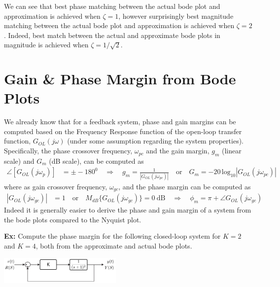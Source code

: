 \documentclass[twoside]{article}
\begin{document}
\vspace{6 pt}

We can see that best phase matching between the actual bode plot and approximation is achieved when
$\zeta = 1$, however surprisingly best magnitude matching between the actual bode plot and approximation is achieved when
$\zeta = 2$. Indeed, best match between the actual and approximate bode plots in magnitude is achieved when $\zeta = 1/\sqrt{2}$. 

\newpage

\section{Gain \& Phase Margin from Bode Plots}

We already know that for a feedback system, phase and 
gain margins can be computed based on the Frequency Response
function of the open-loop transfer function, $G_{OL}(j \omega)$ (under
some assumption regarding the system properties).
Specifically, the phase crossover frequency, $\omega_{pc}$ and the gain margin, 
$g_m$ (linear scale) and $G_m$ (dB scale), can be computed as
%
\begin{align*}
  \angle [ G_{OL}(j \omega_{p}) ] &= \pm -180^0
  \quad \Rightarrow \quad
  g_m = \frac{1}{| G_{OL}(j \omega_{pc})| } \quad \mathrm{or} \quad G_m
  = -20 \, \mathrm{log}_{10} | G_{OL}(j \omega_{pc} ) |
\end{align*}
%
where as gain crossover frequency, $\omega_{gc}$, and the 
phase margin can be computed as
%
\begin{align*}
  | G_{OL}(j \omega_{gc}) | &= 1 \quad \mathrm{or} \quad 
  M_{dB} \lbrace G_{OL}(j \omega_{gc}) \rbrace = 0 \ \mathrm{dB}
   \quad \Rightarrow \quad
  \phi_m = \pi + \angle G_{OL} (j \omega_{gc})
\end{align*}
% 
Indeed it is generally easier to derive the phase and gain margin of
a system from the bode plots compared to the Nyquist plot.

\textbf{Ex:} Compute the phase margin 
for the following closed-loop system for $K = 2$ and $K = 4$,
both from the approximate and actual bode plots. 

\begin{center}
\begin{minipage}[h]{\linewidth}
    \begin{center}
      \includegraphics[width=0.45\textwidth]{ex2block}
    \end{center}
\end{minipage}
\end{center}
\end{document}

